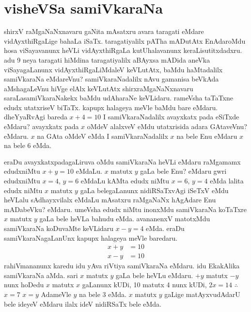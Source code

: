 \chapter{visheVSa samiVkaraNa}

shirxV raMgaNaNxnavaru gaNita mAsatxru avara taragati eMdare vidAyxthiRgaLige bahaLa iSaTx. taragatiyalilx pATha mADutAtx EnAdaroMdu hosa viSayavanunx heVLi vidAyxthiRgaLa kutUhalavanunx keraLisutitxdadxru. adu {\rm 9} neya taragati hiMdina taragatiyalilx aBAyxsa mADida aneVka viSayagaLanunx vidAyxthiRgaLiMdaleV keVLutAtx, baMdu haMtadalilx samiVkaraNa eMdareVnu? samiVkaraNadalilx nAvu gamanisa beVkAda aMshagaLeVnu hiVge elAlx keVLutAtx shirxraMgaNaNxnavaru saraLasamiVkaraNakekx baMdu udAharaNe keVLidaru. rameVsha taTaTxne edudx utatxriseV biTaTx. kapupx halageya meVle baMdu bare eMdaru. dheYyaRvAgi bareda \quad $x+4=10$ \quad I samiVkaraNadalilx avayxkatx pada eSiTxde eMdaru? avayxkatx pada $x$ oMdeV alalxveV eMdu utatxrisida adara GAtaveVnu? eMdaru. $x$ na GAta oMdeV eMda I samiVkaraNadalilx $x$ na bele Enu eMdaru $x$ na bele {\rm 6} eMda.

eraDu avayxkatxpadagaLiruva oMdu samiVkaraNa heVLi eMdaru raMgamamx edudxniMtu \quad $x+y=10$ \quad eMdaLu. $x$ matutx $y$ gaLa bele Enu? eMdaru gwri edudxniMtu \quad $x=4$, \quad $y=6$ \quad eMdaLu kAMta edudx niMtu \quad $x=6$, \quad $y=4$ \quad eMda lalita edudx niMtu $x$ matutx $y$ gaLa belegaLanunx nidiRSaTxvAgi iSeTxV eMdu heVLalu sAdhayxvilalx eMdaLu mAsatxru raMgaNaNx hAgAdare Enu mADabeVku? eMdaru. umeVsha edudx niMtu inonxMdu samiVkaraNa koTaTxre $x$ matutx $y$ gaLa bele heVLa bahudu eMda. avananenxV matotxMdu samiVkaraNa koDuvaMte keVLidaru \quad $x-y=4$ \quad eMda. eraDu samiVkaraNagaLanUnx kapupx halageya meVle baredaru.
\begin{align*}
x+y &=10\\
x-y &=10
\end{align*}
rahiVmananunx karedu idu yAva riVtiya samiVkaraNa eMdaru. idu EkakAlika samiVkaraNa aMda. sari $x$ matutx $y$ gaLa bele heVLu eMdaru. $+y$ \quad matutx \quad $-y$ \quad nunx hoDedu $x$ matutx $x$ gaLanunx kUDi, {\rm 10} matutx {\rm 4} nunx kUDi, \quad $2x=14$ \quad $\therefore$ $x=7$ \quad $x=y$ \quad AdameVle $y$ na bele {\rm 3} eMda. $x$ matutx $y$ gaLige matAyxvudAdarU bele ideyeV eMdaru ilalx ideV nidiRSaTx bele eMda.

